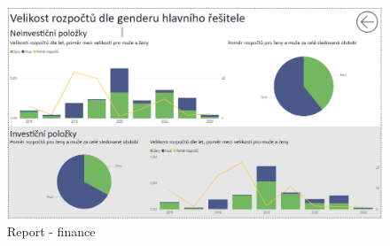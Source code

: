\documentclass[
  digital,     %
  twoside,     %
  lof,         %
  lot,         %
]{fithesis4}
\begin{document}
    \begin{figure}[t]
        \begin{center}
            \includegraphics[width=13cm]{img/finance.png}
        \end{center}
        \caption{Report - finance}
        \label{fig:finance}
    \end{figure}
\end{document}
